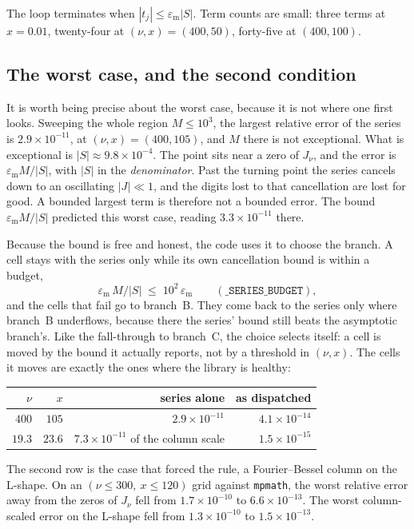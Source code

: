 \documentclass[11pt]{article}
\theoremstyle{remark}
\newcommand{\code}[1]{\texttt{#1}}
\newcommand{\eps}{\varepsilon_{\mathrm{m}}}
\begin{document}
The loop terminates when $|t_j|\le\eps|S|$. Term counts are small: three terms at $x=0.01$,
twenty-four at $(\nu,x)=(400,50)$, forty-five at $(400,100)$.

\subsection{The worst case, and the second condition}
\label{sec:budget}

It is worth being precise about the worst case, because it is not where one first looks.
Sweeping the whole region $M\le10^3$, the largest relative error of the series is
$2.9\times10^{-11}$, at $(\nu,x)=(400,105)$, and $M$ there is not exceptional. What is
exceptional is $|S|\approx9.8\times10^{-4}$. The point sits near a zero of $J_\nu$, and the
error is $\eps M/|S|$, with $|S|$ in the \emph{denominator}. Past the turning point the series
cancels down to an oscillating $|J|\ll1$, and the digits lost to that cancellation are lost for
good. A bounded largest term is therefore not a bounded error. The bound $\eps M/|S|$ predicted
this worst case, reading $3.3\times10^{-11}$ there.

Because the bound is free and honest, the code uses it to choose the branch. A cell stays with
the series only while its own cancellation bound is within a budget,
\[
  \eps\,M/|S| \;\le\; 10^{2}\,\eps \qquad (\code{\_SERIES\_BUDGET}),
\]
and the cells that fail go to branch~B. They come back to the series only where branch~B
underflows, because there the series' bound still beats the asymptotic branch's. Like the
fall-through to branch~C, the choice selects itself: a cell is moved by the bound it actually
reports, not by a threshold in $(\nu,x)$. The cells it moves are exactly the ones where the
library is healthy:
\begin{center}
\begin{tabular}{rrrr}
\toprule
$\nu$ & $x$ & series alone & as dispatched\\
\midrule
$400$ & $105$ & $2.9\times10^{-11}$ & $4.1\times10^{-14}$\\
$19.3$ & $23.6$ & $7.3\times10^{-11}$ of the column scale & $1.5\times10^{-15}$\\
\bottomrule
\end{tabular}
\end{center}
The second row is the case that forced the rule, a Fourier--Bessel column on the L-shape. On an
$(\nu\le300,\ x\le120)$ grid against \code{mpmath}, the worst relative error away from the zeros
of $J_\nu$ fell from $1.7\times10^{-10}$ to $6.6\times10^{-13}$. The worst column-scaled error
on the L-shape fell from $1.3\times10^{-10}$ to $1.5\times10^{-13}$.
\end{document}
